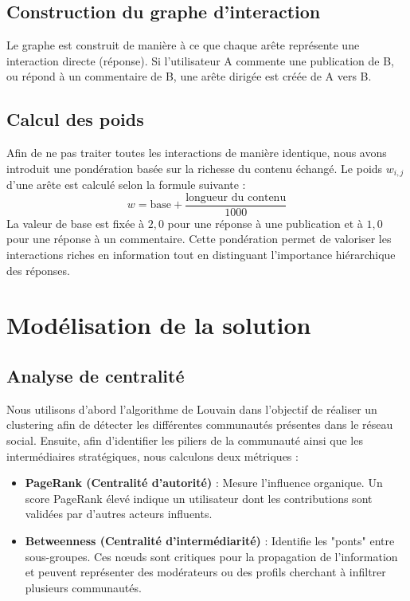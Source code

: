 \documentclass[12pt]{report}
\begin{document}
\subsection{Construction du graphe d'interaction}
Le graphe est construit de manière à ce que chaque arête représente une interaction directe (réponse). Si l'utilisateur A commente une publication de B, ou répond à un commentaire de B, une arête dirigée est créée de A vers B. 

\subsection{Calcul des poids}
Afin de ne pas traiter toutes les interactions de manière identique, nous avons introduit une pondération basée sur la richesse du contenu échangé. 
Le poids $w_{i,j}$ d'une arête est calculé selon la formule suivante : 
\begin{equation}
    w = \text{base} + \frac{\text{longueur du contenu}}{1000}
\end{equation}
La valeur de base est fixée à $2,0$ pour une réponse à une publication et à $1,0$ pour une réponse à un commentaire. Cette pondération permet de valoriser les interactions riches en information tout en distinguant l'importance hiérarchique des réponses.

\section{Modélisation de la solution}
\subsection{Analyse de centralité}
Nous utilisons d'abord l'algorithme de Louvain dans l'objectif de réaliser un clustering afin de détecter les différentes communautés présentes dans le réseau social. Ensuite, afin d'identifier les piliers de la communauté ainsi que les intermédiaires stratégiques, nous calculons deux métriques :
\begin{itemize}
    \item \textbf{PageRank (Centralité d'autorité)} : Mesure l'influence organique. Un score PageRank élevé indique un utilisateur dont les contributions sont validées par d'autres acteurs influents.
    \item \textbf{Betweenness (Centralité d'intermédiarité)} : Identifie les "ponts" entre sous-groupes. Ces nœuds sont critiques pour la propagation de l'information et peuvent représenter des modérateurs ou des profils cherchant à infiltrer plusieurs communautés.
\end{itemize}
\end{document}
